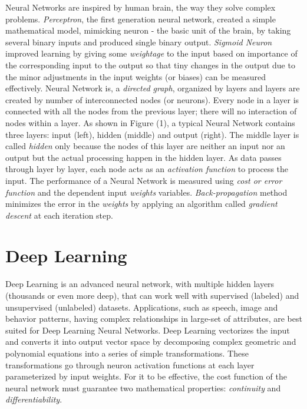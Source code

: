 \documentclass[sigconf]{acmart}
\begin{document}
	Neural Networks are inspired by human brain, the way they solve complex problems. {\em Perceptron}, the first generation neural network, created a simple mathematical model, mimicking neuron - the basic unit of the brain, by taking several binary inputs and produced single binary output. {\em Sigmoid Neuron} improved learning by giving some {\em weightage} to the input based on importance of the corresponding input to the output so that tiny changes in the output due to the minor adjustments in the input weights (or biases) can be measured effectively. Neural Network is, a {\em directed graph}, organized by layers and layers are created by number of interconnected nodes (or neurons). Every node in a layer is connected with all the nodes from the previous layer; there will no interaction of nodes within a layer. As shown in Figure (1), a typical Neural Network contains three layers: input (left), hidden (middle) and output (right). The middle layer is called {\em hidden} only because the nodes of this layer are neither an input nor an output but the actual processing happen in the hidden layer. As data passes through layer by layer, each node acts as an {\em activation function} to process the input. The performance of a Neural Network is measured using {\em cost or error function} and the dependent input {\em weights} variables. {\em Back-propagation} method minimizes the error in the {\em weights} by applying an algorithm called {\em gradient descent} at each iteration step. 
	
	\section{Deep Learning}
	
	Deep Learning is an advanced neural network, with multiple hidden layers (thousands or even more deep), that can work well with supervised (labeled) and unsupervised (unlabeled) datasets. Applications, such as speech, image and behavior patterns, having complex relationships in large-set of attributes, are best suited for Deep Learning Neural Networks. Deep Learning vectorizes the input and converts it into output vector space by decomposing complex geometric and polynomial equations into a series of simple transformations. These transformations go through neuron activation functions at each layer parameterized by input weights. For it to be effective, the cost function of the neural network must guarantee two mathematical properties: {\em continuity} and {\em differentiability}.
	
\end{document}
